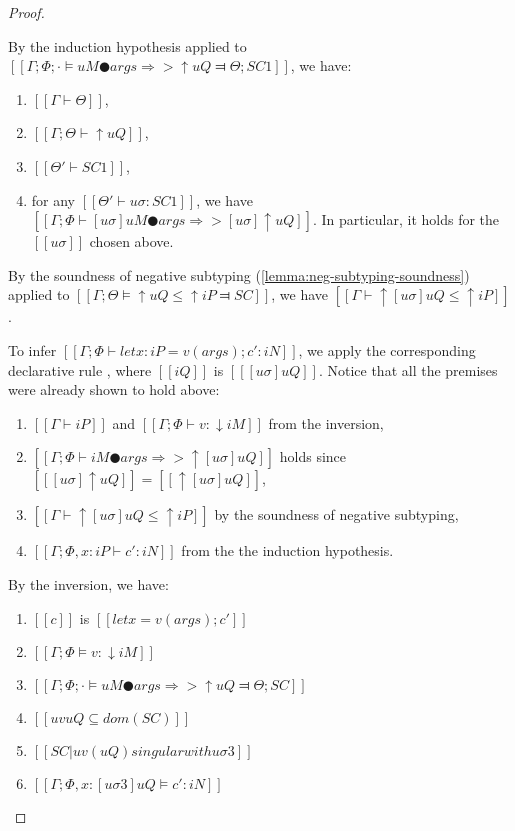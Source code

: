 \begin{proof}
\begin{caseof}
        By the induction hypothesis applied to $[[Γ; Φ; · ⊨ uM ● args ⇒> ↑uQ ⫤ Θ; SC1]]$, we have:
        \begin{enumerate}
            \item \label{typing-soundness:theta-wf} $[[Γ ⊢ Θ]]$,
            \item $[[Γ; Θ ⊢ ↑uQ]]$,
            \item $[[Θ' ⊢ SC1]]$,
            \item for any $[[Θ' ⊢ uσ : SC1]]$, we have $[[ Γ ; Φ ⊢ [uσ]uM ● args ⇒> [uσ]↑uQ ]]$.
            In particular, it holds for the $[[uσ]]$ chosen above. 
        \end{enumerate}

        By the soundness of negative subtyping (\cref{lemma:neg-subtyping-soundness})
        applied to $[[Γ; Θ ⊨ ↑uQ ≤ ↑iP ⫤ SC]]$, we have $[[Γ ⊢ ↑[uσ]uQ ≤ ↑iP]]$.

        To infer $[[Γ ; Φ ⊢ let x : iP = v(args); c' : iN ]]$,
        we apply the corresponding declarative rule , where
        $[[iQ]]$ is $[[ [uσ]uQ  ]]$. Notice that all the premises were already shown to
        hold above:
        \begin{enumerate}
            \item $[[Γ ⊢ iP]]$ and $[[Γ; Φ ⊢ v : ↓iM]]$ from the inversion,
            \item $[[Γ; Φ ⊢ iM ● args ⇒> ↑[uσ]uQ]]$ holds since $[[ [uσ]↑uQ ]] = [[ ↑[uσ]uQ ]]$,
            \item $[[Γ ⊢ ↑[uσ]uQ ≤ ↑iP]]$ by the soundness of negative subtyping,
            \item $[[Γ; Φ, x:iP ⊢ c' : iN]]$ from the the induction hypothesis.
        \end{enumerate}

        \item {}
        By the inversion, we have:
        \begin{enumerate}
            \item $[[c]]$ is $[[let x = v(args) ; c']]$
            \item $[[Γ; Φ ⊨ v : ↓iM]]$ 
            \item $[[Γ ; Φ ; · ⊨ uM ● args ⇒> ↑uQ ⫤ Θ; SC]]$
            \item $[[uv uQ ⊆ dom(SC)]]$
            \item $[[SC|uv(uQ) singular with uσ3]]$
            \item $[[Γ; Φ, x:[uσ3]uQ ⊨ c' : iN]]$
        \end{enumerate}


\end{caseof}
\end{proof}
